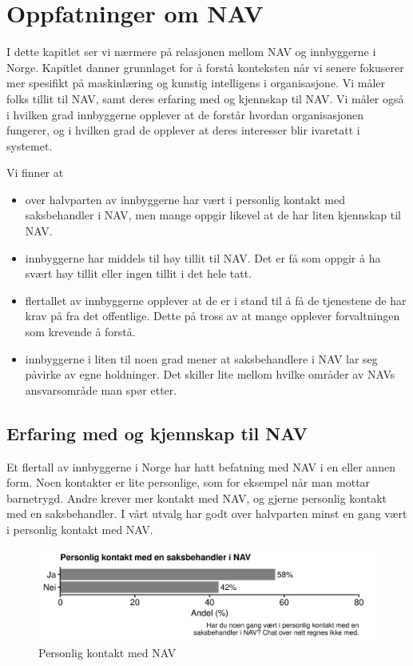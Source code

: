 \documentclass[
]{book}
\begin{document}
\hypertarget{oppfatninger-om-nav}{%
\chapter{Oppfatninger om NAV}\label{oppfatninger-om-nav}}

I dette kapitlet ser vi nærmere på relasjonen mellom NAV og innbyggerne i Norge.
Kapitlet danner grunnlaget for å forstå konteksten når vi senere fokuserer mer spesifikt på maskinlæring og kunstig intelligens i organisasjone.
Vi måler folks tillit til NAV, samt deres erfaring med og kjennskap til NAV.
Vi måler også i hvilken grad innbyggerne opplever at de forstår hvordan organisasjonen fungerer, og i hvilken grad de opplever at deres interesser blir ivaretatt i systemet.

Vi finner at

\begin{itemize}
\item
  over halvparten av innbyggerne har vært i personlig kontakt med saksbehandler i NAV, men mange oppgir likevel at de har liten kjennskap til NAV.
\item
  innbyggerne har middels til høy tillit til NAV. Det er få som oppgir å ha svært høy tillit eller ingen tillit i det hele tatt.
\item
  flertallet av innbyggerne opplever at de er i stand til å få de tjenestene de har krav på fra det offentlige. Dette på tross av at mange opplever forvaltningen som krevende å forstå.
\item
  innbyggerne i liten til noen grad mener at saksbehandlere i NAV lar seg påvirke av egne holdninger. Det skiller lite mellom hvilke områder av NAVs ansvarsområde man spør etter.
\end{itemize}

\hypertarget{erfaring-med-og-kjennskap-til-nav}{%
\section{Erfaring med og kjennskap til NAV}\label{erfaring-med-og-kjennskap-til-nav}}

Et flertall av innbyggerne i Norge har hatt befatning med NAV i en eller annen form.
Noen kontakter er lite personlige, som for eksempel når man mottar barnetrygd.
Andre krever mer kontakt med NAV, og gjerne personlig kontakt med en saksbehandler.
I vårt utvalg har godt over halvparten minst en gang vært i personlig kontakt med NAV.

\begin{figure}
\centering
\includegraphics{figs/png/fig_nav_personal_contact.png}
\caption{Personlig kontakt med NAV}
\end{figure}
\end{document}
